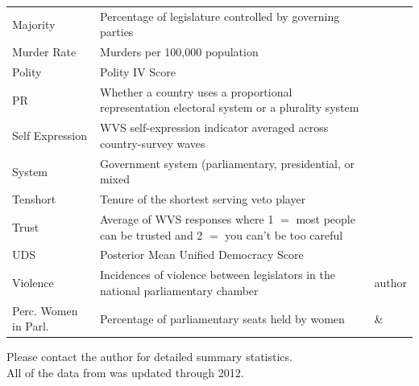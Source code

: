 \documentclass[a4paper]{article}\usepackage[]{graphicx}\usepackage[]{color}
\begin{document}
\begin{table}[!h]
\begin{center}
\begin{tabular}{l m{7cm} m{3.5cm}}
            Majority & Percentage of legislature controlled by governing parties & \cite{DPI2001} \\
            Murder Rate & Murders per 100,000 population & \cite{UNMurder2013} \\
            Polity & Polity IV Score & \cite{Marshall2009} \\
            PR & Whether a country uses a proportional representation electoral system or a plurality system & \cite{DPI2001} \\
            Self Expression & WVS self-expression indicator averaged across country-survey waves & \cite{WVS2009} \\
            System & Government system (parliamentary, presidential, or mixed & \cite{DPI2001} \\
            Tenshort & Tenure of the shortest serving veto player & \cite{DPI2001} \\
            Trust & Average of WVS responses where 1 $=$ most people can be trusted and 2 $=$ you can't be too careful & \cite{WVS2009} \\
            UDS & Posterior Mean Unified Democracy Score & \cite{Pemstein2010} \\
            Violence & Incidences of violence between legislators in the national parliamentary chamber & author \\
            Perc. Women in Parl. & Percentage of parliamentary seats held by women & \cite{WomParCrossNat} \& \cite{IPU2013} \\
            \hline

    \end{tabular}
    \end{center}
    \begin{singlespace}
        Please contact the author for detailed summary statistics. \\
        All of the data from \cite{DPI2001} was updated through 2012.
    \end{singlespace}
\end{table}
\end{document}
